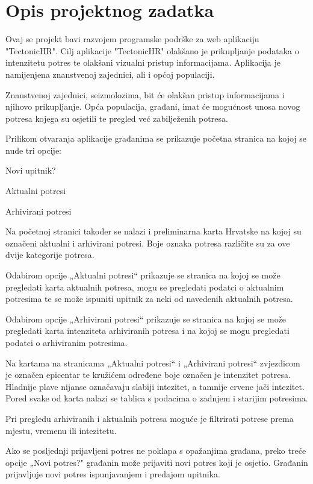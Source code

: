\chapter{Opis projektnog zadatka}
		


{Ovaj se projekt bavi razvojem programske podrške za web aplikaciju "TectonicHR". 
	Cilj aplikacije "TectonicHR" olakšano je prikupljanje podataka o intenzitetu potres te olakšani vizualni pristup informacijama. 
	Aplikacija je namijenjena znanstvenoj zajednici, ali i općoj populaciji.
	 
	Znanstvenoj zajednici, seizmolozima, bit će olakšan pristup informacijama i njihovo prikupljanje.  
	Opća populacija, građani, imat će mogućnost unosa novog potresa kojega su osjetili te pregled već zabilježenih potresa.  
	
	Prilikom otvaranja aplikacije građanima se prikazuje početna stranica na kojoj se nude tri opcije:
		\begin{packed_item}
			\item Novi upitnik?
			\item Aktualni potresi
			\item Arhivirani potresi
		\end{packed_item}
	Na početnoj stranici također se nalazi i preliminarna karta Hrvatske na kojoj su označeni aktualni i arhivirani potresi. Boje oznaka potresa različite su za ove dvije kategorije potresa.
	
	Odabirom opcije „Aktualni potresi“ prikazuje se stranica na kojoj se može pregledati karta aktualnih potresa, mogu se pregledati podatci o aktualnim potresima te se može ispuniti upitnik za neki od navedenih aktualnih potresa.
	
	Odabirom opcije „Arhivirani potresi“ prikazuje se stranica na kojoj se može pregledati karta intenziteta arhiviranih potresa i na kojoj se mogu pregledati podatci o arhiviranim potresima.
	
	Na kartama na stranicama „Aktualni potresi“ i „Arhivirani potresi“ zvjezdicom je označen epicentar te kružićem određene boje označen je intenzitet potresa. Hladnije plave nijanse označavaju slabiji intezitet, a tamnije crvene jači intezitet. 
	Pored svake od karta nalazi se tablica s podacima o zadnjem i starijim potresima.
	
	Pri pregledu arhiviranih i aktualnih potresa moguće je filtrirati potrese prema mjestu, vremenu ili intezitetu. 
	
	Ako se posljednji prijavljeni potres ne poklapa s opažanjima građana, preko treće opcije „Novi potres?" građanin može prijaviti novi potres koji je osjetio. Građanin prijavljuje novi potres ispunjavanjem i predajom upitnika.
	
}
